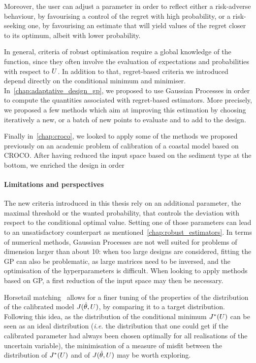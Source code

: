 \documentclass[../../Main_ManuscritThese.tex]{subfiles}
\begin{document}
Moreover, the user can adjust a parameter in order to reflect either a
risk-adverse behaviour, by favourising a control of the regret with
high probability, or a risk-seeking one, by favourising an estimate
that will yield values of the regret closer to its optimum, albeit
with lower probability.


In general, criteria of robust optimisation require a global
knowledge of the function, since they often involve the evaluation of
expectations and probabilities with respect to $U$. In addition to
that, regret-based criteria we introduced depend directly on the
conditional minimum and minimiser. In~\cref{chap:adaptative_design_gp},
we proposed to use Gaussian Processes in order to compute the
quantities associated with regret-based estimators. More precisely, we
proposed a few methods which aim at improving this estimation by
choosing iteratively a new, or a batch of new points to evaluate and
to add to the design.

Finally in~\cref{chap:croco}, we looked to apply some of the methods
we proposed previously on an academic problem of calibration of a
coastal model based on CROCO. After having reduced the input space
based on the sediment type at the bottom, we enriched the design in order 

\paragraph{Limitations and perspectives}
The new criteria introduced in this thesis rely on an additional
parameter, the maximal threshold or the wanted probability, that
controls the deviation with respect to the conditional optimal
value. Setting one of those parameters can lead to an unsatisfactory
counterpart as mentioned~\cref{chap:robust_estimators}. In terms of
numerical methods, Gaussian Processes are not well suited for problems
of dimension larger than about \num{10}: when too large designs are
considered, fitting the GP can also be problematic, as large matrices
need to be inversed, and the optimisation of the hyperparameters is
difficult.  When looking to apply methods based on GP, a first
reduction of the input space may then be necessary.


Horsetail matching~\cite{cook_extending_2017,cook_horsetail_2018}
allows for a finer tuning of the properties of the distribution of the
calibrated model $J(\hat{\theta},U)$, by comparing it to a target
distribution. Following this idea, as the distribution of the
conditional minimum $J^*(U)$ can be seen as an ideal distribution
(\emph{i.e.} the distribution that one could get if the calibrated
parameter had always been chosen optimally for all realisations of the
uncertain variable), the minimisation of a measure of misfit between
the distribution of $J^*(U)$ and of $J(\hat{\theta},U)$ may be worth
exploring.
\end{document}
